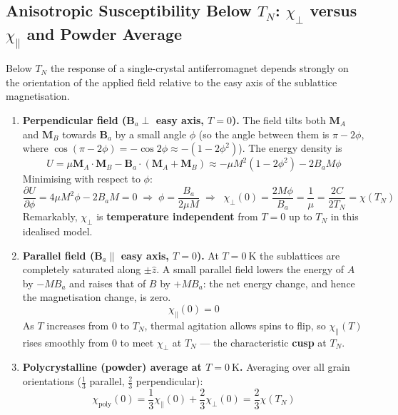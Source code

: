 \documentclass[11pt,a4paper]{article}
\newcommand{\vb}[1]{\mathbf{#1}}
\begin{document}
\subsection{Anisotropic Susceptibility Below \texorpdfstring{$T_N$}{TN}: \texorpdfstring{$\chi_\perp$ versus $\chi_\parallel$}{chi-perp versus chi-parallel} and Powder Average}

Below $T_N$ the response of a single-crystal antiferromagnet depends strongly on the orientation of the applied field relative to the easy axis of the sublattice magnetisation.

\begin{enumerate}[leftmargin=1.6cm]
    \item \textbf{Perpendicular field ($\vb{B}_a\perp$ easy axis, $T=0$).}
    The field tilts both $\vb{M}_A$ and $\vb{M}_B$ towards $\vb{B}_a$ by a small angle $\phi$ (so the angle between them is $\pi-2\phi$, where $\cos(\pi-2\phi)=-\cos 2\phi\approx-(1-2\phi^2)$). The energy density is
    \begin{equation}
        U = \mu\vb{M}_A\cdot\vb{M}_B - \vb{B}_a\cdot(\vb{M}_A+\vb{M}_B)
        \approx -\mu M^2(1-2\phi^2) - 2B_aM\phi
        \label{eq:afmU}
    \end{equation}
    Minimising with respect to $\phi$:
    \begin{equation}
        \frac{\partial U}{\partial\phi} = 4\mu M^2\phi - 2B_aM = 0
        \;\Longrightarrow\;
        \phi = \frac{B_a}{2\mu M}
        \;\Longrightarrow\;
        \boxed{\;\chi_\perp(0) = \frac{2M\phi}{B_a} = \frac{1}{\mu} = \frac{2C}{2T_N} = \chi(T_N)\;}
        \label{eq:chiperp}
    \end{equation}
    Remarkably, $\chi_\perp$ is \textbf{temperature independent} from $T=0$ up to $T_N$ in this idealised model.
    \item \textbf{Parallel field ($\vb{B}_a\parallel$ easy axis, $T=0$).}
    At $T=0\ \mathrm{K}$ the sublattices are completely saturated along $\pm\hat{z}$. A small parallel field lowers the energy of $A$ by $-MB_a$ and raises that of $B$ by $+MB_a$: the net energy change, and hence the magnetisation change, is zero.
    \begin{equation}
        \boxed{\;\chi_\parallel(0) = 0\;}
        \label{eq:chipar}
    \end{equation}
    As $T$ increases from $0$ to $T_N$, thermal agitation allows spins to flip, so $\chi_\parallel(T)$ rises smoothly from $0$ to meet $\chi_\perp$ at $T_N$ --- the characteristic \textbf{cusp} at $T_N$.
    \item \textbf{Polycrystalline (powder) average at $T=0\ \mathrm{K}$.}
    Averaging over all grain orientations ($\frac{1}{3}$ parallel, $\frac{2}{3}$ perpendicular):
    \begin{equation}
        \boxed{\;\chi_{\mathrm{poly}}(0) = \frac{1}{3}\chi_\parallel(0) + \frac{2}{3}\chi_\perp(0) = \frac{2}{3}\chi(T_N)\;}
        \label{eq:chipoly}
    \end{equation}
\end{enumerate}
\end{document}
